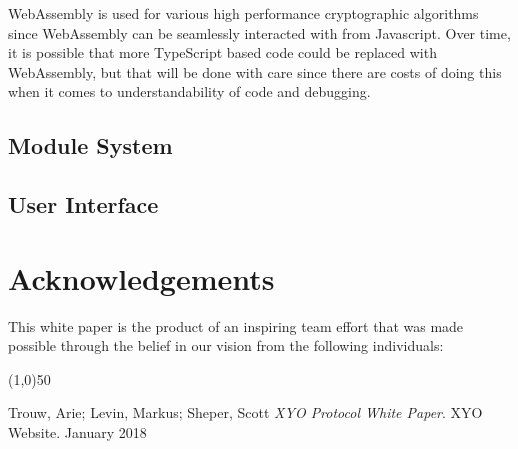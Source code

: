 \documentclass{article}
\begin{document}
WebAssembly is used for various high performance cryptographic algorithms since WebAssembly can be seamlessly interacted with from Javascript.  Over time, it is possible that more TypeScript based code could be replaced with WebAssembly, but that will be done with care since there are costs of doing this when it comes to understandability of code and debugging.

\subsection{Module System}

\subsection{User Interface}

\section {Acknowledgements}
This white paper is the product of an inspiring team effort that was made possible through the belief in our vision from the following individuals: 

\begin{center}
    \line(1,0){50}
\end{center}



\begin{thebibliography}{9}

    Trouw, Arie; Levin, Markus; Sheper, Scott
    \textit{XYO Protocol White Paper}.
    XYO Website. January 2018

\end{thebibliography}

\clearpage

\printglossaries

\end{document}
